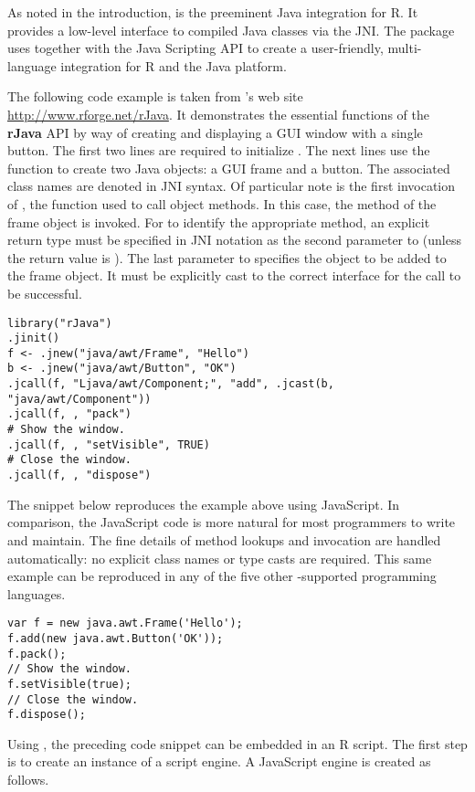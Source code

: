 As noted in the introduction,  is the preeminent Java integration for R. It provides a low-level interface to compiled Java classes via the JNI. The  package uses  together with the Java Scripting API to create a user-friendly, multi-language integration for R and the Java platform.

The following code example is taken from 's web site \url{http://www.rforge.net/rJava}. It demonstrates the essential functions of the \textbf{rJava} API by way of creating and displaying a GUI window with a single button. The first two lines are required to initialize . The next lines use the  function to create two Java objects: a GUI frame and a button. The associated class names are denoted in JNI syntax. Of particular note is the first invocation of , the function used to call object methods. In this case, the  method of the frame object is invoked. For  to identify the appropriate method, an explicit return type must be specified in JNI notation as the second parameter to  (unless the return value is ). The last parameter to  specifies the object to be added to the frame object. It must be explicitly cast to the correct interface for the call to be successful.

\begin{verbatim}
library("rJava")
.jinit()
f <- .jnew("java/awt/Frame", "Hello")
b <- .jnew("java/awt/Button", "OK")
.jcall(f, "Ljava/awt/Component;", "add", .jcast(b, "java/awt/Component"))
.jcall(f, , "pack")
# Show the window.
.jcall(f, , "setVisible", TRUE)
# Close the window.
.jcall(f, , "dispose")
\end{verbatim}

The snippet below reproduces the  example above using JavaScript. In comparison, the JavaScript code is more natural for most programmers to write and maintain. The fine details of method lookups and invocation are handled automatically: no explicit class names or type casts are required. This same example can be reproduced in any of the five other -supported programming languages.

\begin{verbatim}
var f = new java.awt.Frame('Hello');
f.add(new java.awt.Button('OK'));
f.pack();
// Show the window.
f.setVisible(true);
// Close the window.
f.dispose();
\end{verbatim}

Using , the preceding code snippet can be embedded in an R script. The first step is to create an instance of a script engine. A JavaScript engine is created as follows.

